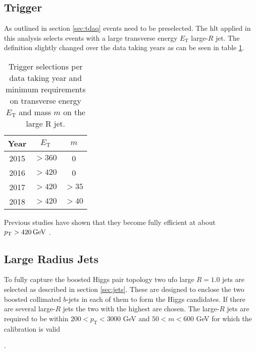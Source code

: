 \subsection{Trigger}
As outlined in section \ref{sec:tdaq} events need to be preselected. The \ac{hlt} applied in this analysis selects events with a large transverse energy $E_\text{T}$ large-$R$ jet. The definition slightly changed over the data taking years as can be seen in table \ref{tab:trigger}.
\begin{table}[htbp]
    \centering
    \caption{Trigger selections per data taking year and minimum requirements on transverse energy $E_\text{T}$ and mass $m$ on the large R jet. }
    \begin{tabular}{ccc}
        \hline
        Year & $E_\text{T}$ & $m$   \\ \hline
        2015 & $>360$       & 0     \\
        2016 & $>420$       & 0     \\
        2017 & $>420$       & $>35$ \\
        2018 & $>420$       & $>40$ \\ \hline
    \end{tabular}
    \label{tab:trigger}
\end{table}
Previous studies have shown that they become fully efficient at about $p_{\text{T}}>\qty[]{420}{GeV}$ \citep{ATL-COM-PHYS-2020-083,ATL-COM-PHYS-2023-033}.

\subsection{Large Radius Jets}
To fully capture the boosted Higgs pair topology two \ac{ufo} large $R=1.0$ jets are selected as described in section \ref{sec:jets}. These are designed to enclose the two boosted collimated $b$-jets in each of them to form the Higgs candidates. If there are several large-$R$ jets the two with the highest \pt are chosen. The large-$R$ jets are required to be within $200<p_{\text{T}}<3000$ GeV and $50<m<600$ GeV for which the calibration is valid

.

